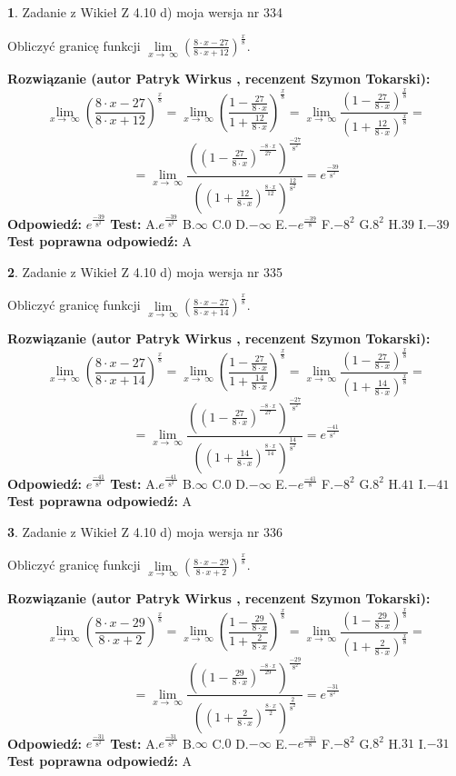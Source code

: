 \documentclass[12pt, a4paper]{article}
\theoremstyle{definition} %
\newtheorem{zad}{}
\newcommand{\zadStart}[1]{\begin{zad}#1\newline}
\newcommand{\zadStop}{\end{zad}}
\newcommand{\rozwStart}[2]{\noindent \textbf{Rozwiązanie (autor #1 , recenzent #2): }\newline}
\newcommand{\rozwStop}{\newline}
\newcommand{\odpStart}{\noindent \textbf{Odpowiedź:}\newline}
\newcommand{\odpStop}{\newline}
\newcommand{\testStart}{\noindent \textbf{Test:}\newline}
\newcommand{\testStop}{\newline}
\newcommand{\kluczStart}{\noindent \textbf{Test poprawna odpowiedź:}\newline}
\newcommand{\kluczStop}{\newline}
\begin{document}
\zadStart{Zadanie z Wikieł Z 4.10 d) moja wersja nr 334}


Obliczyć granicę funkcji  $\lim\limits_{x\to\ \infty}(\frac{8\cdot x-27}{8\cdot x+12})^{\frac{x}{8}}$.
\zadStop
\rozwStart{Patryk Wirkus}{Szymon Tokarski}
$$\lim\limits_{x\to\ \infty}(\frac{8\cdot x-27}{8\cdot x+12})^{\frac{x}{8}} = \lim\limits_{x\to\ \infty}(\frac{1-\frac{27}{8\cdot x}}{1+\frac{12}{8\cdot x}})^{\frac{x}{8}}=\lim\limits_{x\to\ \infty}\frac{(1-\frac{27}{8\cdot x})^{\frac{x}{8}}}{(1+\frac{12}{8\cdot x})^{\frac{x}{8}}}=$$
$$=\lim\limits_{x\to\ \infty}\frac{((1-\frac{27}{8\cdot x})^{\frac{-8\cdot x}{27}})^{\frac{-27}{8^{2}}}}{((1+\frac{12}{8\cdot x})^{\frac{8\cdot x}{12}})^{\frac{12}{8^{2}}}}=e^{\frac{-39}{8^{2}}}$$
\rozwStop
\odpStart
$e^{\frac{-39}{8^{2}}}$
\odpStop
\testStart
A.$e^{\frac{-39}{8^{2}}}$ B.$\infty$ C.$0$ D.$-\infty$ E.$-e^{\frac{-39}{8}}$
F.$-8^{2}$ G.$8^{2}$
H.$39$
I.$-39$
\testStop
\kluczStart
A
\kluczStop



\zadStart{Zadanie z Wikieł Z 4.10 d) moja wersja nr 335}


Obliczyć granicę funkcji  $\lim\limits_{x\to\ \infty}(\frac{8\cdot x-27}{8\cdot x+14})^{\frac{x}{8}}$.
\zadStop
\rozwStart{Patryk Wirkus}{Szymon Tokarski}
$$\lim\limits_{x\to\ \infty}(\frac{8\cdot x-27}{8\cdot x+14})^{\frac{x}{8}} = \lim\limits_{x\to\ \infty}(\frac{1-\frac{27}{8\cdot x}}{1+\frac{14}{8\cdot x}})^{\frac{x}{8}}=\lim\limits_{x\to\ \infty}\frac{(1-\frac{27}{8\cdot x})^{\frac{x}{8}}}{(1+\frac{14}{8\cdot x})^{\frac{x}{8}}}=$$
$$=\lim\limits_{x\to\ \infty}\frac{((1-\frac{27}{8\cdot x})^{\frac{-8\cdot x}{27}})^{\frac{-27}{8^{2}}}}{((1+\frac{14}{8\cdot x})^{\frac{8\cdot x}{14}})^{\frac{14}{8^{2}}}}=e^{\frac{-41}{8^{2}}}$$
\rozwStop
\odpStart
$e^{\frac{-41}{8^{2}}}$
\odpStop
\testStart
A.$e^{\frac{-41}{8^{2}}}$ B.$\infty$ C.$0$ D.$-\infty$ E.$-e^{\frac{-41}{8}}$
F.$-8^{2}$ G.$8^{2}$
H.$41$
I.$-41$
\testStop
\kluczStart
A
\kluczStop



\zadStart{Zadanie z Wikieł Z 4.10 d) moja wersja nr 336}


Obliczyć granicę funkcji  $\lim\limits_{x\to\ \infty}(\frac{8\cdot x-29}{8\cdot x+2})^{\frac{x}{8}}$.
\zadStop
\rozwStart{Patryk Wirkus}{Szymon Tokarski}
$$\lim\limits_{x\to\ \infty}(\frac{8\cdot x-29}{8\cdot x+2})^{\frac{x}{8}} = \lim\limits_{x\to\ \infty}(\frac{1-\frac{29}{8\cdot x}}{1+\frac{2}{8\cdot x}})^{\frac{x}{8}}=\lim\limits_{x\to\ \infty}\frac{(1-\frac{29}{8\cdot x})^{\frac{x}{8}}}{(1+\frac{2}{8\cdot x})^{\frac{x}{8}}}=$$
$$=\lim\limits_{x\to\ \infty}\frac{((1-\frac{29}{8\cdot x})^{\frac{-8\cdot x}{29}})^{\frac{-29}{8^{2}}}}{((1+\frac{2}{8\cdot x})^{\frac{8\cdot x}{2}})^{\frac{2}{8^{2}}}}=e^{\frac{-31}{8^{2}}}$$
\rozwStop
\odpStart
$e^{\frac{-31}{8^{2}}}$
\odpStop
\testStart
A.$e^{\frac{-31}{8^{2}}}$ B.$\infty$ C.$0$ D.$-\infty$ E.$-e^{\frac{-31}{8}}$
F.$-8^{2}$ G.$8^{2}$
H.$31$
I.$-31$
\testStop
\kluczStart
A
\kluczStop
\end{document}
